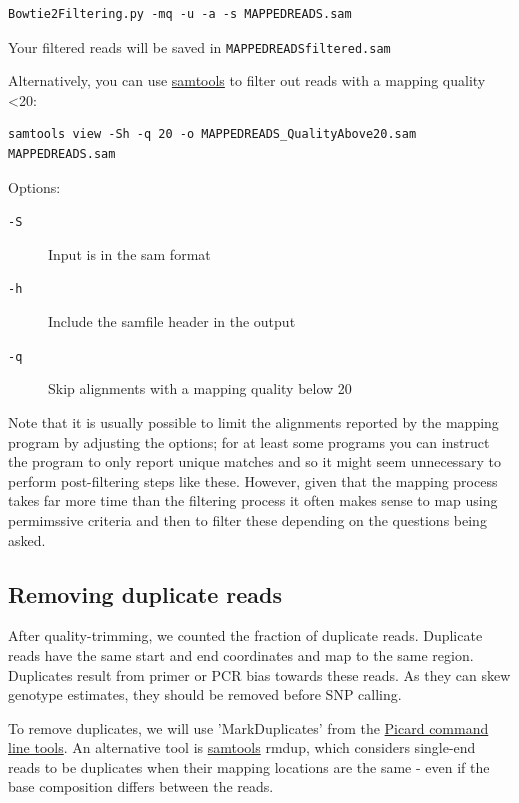 \documentclass[11pt]{article}
\begin{document}
\begin{verbatim}
Bowtie2Filtering.py -mq -u -a -s MAPPEDREADS.sam
\end{verbatim}

Your filtered reads will be saved in \texttt{MAPPEDREADSfiltered.sam}

Alternatively, you can 
use \href{http://samtools.sourceforge.net/samtools.shtml#mpileup}{samtools} to filter out reads with a mapping quality <20:

\begin{verbatim}
samtools view -Sh -q 20 -o MAPPEDREADS_QualityAbove20.sam MAPPEDREADS.sam
\end{verbatim}

Options:

\begin{description}
\item[{\texttt{-S}}] Input is in the sam format
\item[{\texttt{-h}}] Include the samfile header in the output
\item[{\texttt{-q}}] Skip alignments with a mapping quality below 20
\end{description}

Note that it is usually possible to limit the alignments reported by the
mapping program by adjusting the options; for at least some programs you can
instruct the program to only report unique matches and so it might seem
unnecessary to perform post-filtering steps like these. However, given that
the mapping process takes far more time than the filtering process it often
makes sense to map using permimssive criteria and then to filter these
depending on the questions being asked.

\subsection{Removing duplicate reads}
\label{sec:orgheadline4}
After quality-trimming, we counted the fraction of duplicate
reads. Duplicate reads have the same start and end
coordinates and map to the same region. Duplicates result from primer
or PCR bias towards these reads. As they can skew genotype estimates,
they should be removed before SNP calling.

To remove duplicates, we will use 'MarkDuplicates' from the \href{https://broadinstitute.github.io/picard/command-line-overview.html}{Picard
command line tools}. An alternative tool is \href{http://samtools.sourceforge.net/samtools.shtml}{samtools} rmdup, which
considers single-end reads to be duplicates when their mapping
locations are the same - even if the base composition differs between
the reads.
\end{document}
